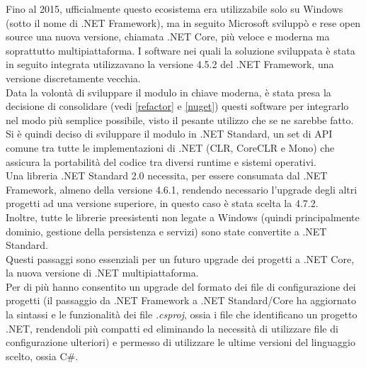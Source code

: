 \documentclass[\main/Tesi.tex]{subfiles}
\begin{document}
Fino al 2015, ufficialmente questo ecosistema era utilizzabile solo su Windows (sotto il nome di .NET Framework), ma in seguito Microsoft sviluppò e rese open source una nuova versione, chiamata .NET Core, più veloce e moderna ma soprattutto multipiattaforma.
I software nei quali la soluzione sviluppata è stata in seguito integrata utilizzavano la versione 4.5.2 del .NET Framework, una versione discretamente vecchia.\\
Data la volontà di sviluppare il modulo in chiave moderna, è stata presa la decisione di consolidare (vedi \ref{refactor} e \ref{nuget}) questi software per integrarlo nel modo più semplice possibile, visto il pesante utilizzo che se ne sarebbe fatto.\\
Si è quindi deciso di sviluppare il modulo in .NET Standard, un set di API comune tra tutte le implementazioni di .NET (CLR, CoreCLR e Mono) che assicura la portabilità del codice tra diversi runtime e sistemi operativi.\\
Una libreria .NET Standard 2.0 necessita, per essere consumata dal .NET Framework, almeno della versione 4.6.1, rendendo necessario l'upgrade degli altri progetti ad una versione superiore, in questo caso è stata scelta la 4.7.2.\\
Inoltre, tutte le librerie preesistenti non legate a Windows (quindi principalmente dominio, gestione della persistenza e servizi) sono state convertite a .NET Standard.\\
Questi passaggi sono essenziali per un futuro upgrade dei progetti a .NET Core, la nuova versione di .NET multipiattaforma.\\
Per di più hanno consentito un upgrade del formato dei file di configurazione dei progetti (il passaggio da .NET Framework a .NET Standard/Core ha aggiornato la sintassi e le funzionalità dei file \textit{.csproj}, ossia i file che identificano un progetto .NET, rendendoli più compatti ed eliminando la necessità di utilizzare file di configurazione ulteriori) e permesso di utilizzare le ultime versioni del linguaggio scelto, ossia C\#.
\end{document}
